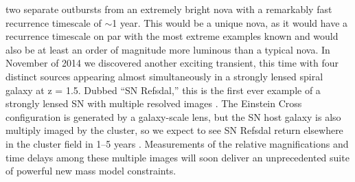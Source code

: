 two separate outbursts from an extremely bright nova with a remarkably fast
recurrence timescale of $\sim$1 year. This would be a unique nova, as it would
have a recurrence timescale on par with the most extreme examples known
\citep{Tang2014} and would also be at least an order of magnitude more luminous
than a typical nova.
In November of 2014 we discovered another exciting transient, this time with
four distinct sources appearing almost simultaneously in a strongly lensed
spiral galaxy at z = 1.5. Dubbed “SN Refsdal,” this is the first ever example of
a strongly lensed SN with multiple resolved images \citep[][Figure
3]{Kelly2014}. The Einstein Cross configuration is generated by a galaxy-scale
lens, but the SN host galaxy is also multiply imaged by the cluster, so we
expect to see SN Refsdal return elsewhere in the cluster field in 1–5 years
\citep{Oguri2015, Sharon2015}. Measurements of the relative magnifications and
time delays among these multiple images will soon deliver an unprecedented suite
of powerful new mass model constraints.



